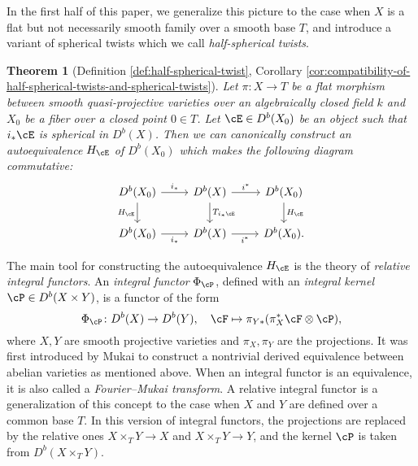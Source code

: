 \documentclass[12pt]{amsart}
\numberwithin{equation}{section}
\theoremstyle{plain}
\newtheorem{theorem}{Theorem}[section]
\theoremstyle{definition}
\begin{document}
In the first half of this paper, we generalize this picture to the case when $X$ is a flat but not necessarily smooth family over a smooth base $T$, and introduce a variant of spherical twists which we call \emph{half-spherical twists}.
\begin{theorem}[Definition \ref{def:half-spherical-twist}, Corollary \ref{cor:compatibility-of-half-spherical-twists-and-spherical-twists}]\label{thm:main-theorem-1-half-spherical-twist}
    Let $\pi \colon X \to T$ be a flat morphism between smooth quasi-projective varieties over an algebraically closed field $k$ and $X_0$ be a fiber over a closed point $0 \in T$.
    Let $\cE \in D^b(X_0)$ be an object such that $i_*{\cE}$ is spherical in $D^b(X)$.
    Then we can canonically construct an autoequivalence $H_{\cE}$ of $D^b(X_0)$ which makes the following diagram commutative:
    \begin{equation}\label{eq:half-spherical-twist-commutative-diagram}
        \begin{tikzcd}
            D^b(X_0) \ar[r, "i_*"] \ar[d, "H_{\cE}"'] & D^b(X) \ar[r, "i^*"]\ar[d, "T_{i_*{\cE}}"] & D^b(X_0) \ar[d,  "H_{\cE}"]\\
            D^b(X_0) \ar[r, "i_*"'] & D^b(X) \ar[r, "i^*"'] & D^b(X_0).
        \end{tikzcd}
    \end{equation}
\end{theorem}

The main tool for constructing the autoequivalence $H_{\cE}$ is the theory of \emph{relative integral functors}.
An \emph{integral functor} $\Phi_{\cP}$, defined with an \emph{integral kernel} $\cP \in D^b(X \times Y)$, is a functor of the form
\begin{equation}
    \Phi_{\cP} \colon D^b(X) \to D^b(Y), \quad \cF \mapsto \pi_{Y*}(\pi_X^*\cF \otimes \cP),
\end{equation}
where $X, Y$ are smooth projective varieties and $\pi_X, \pi_Y$ are the projections.
It was first introduced by Mukai \cite{MR607081} to construct a nontrivial derived equivalence between abelian varieties as mentioned above.
When an integral functor is an equivalence, it is also called a \emph{Fourier--Mukai transform}.
A relative integral functor is a generalization of this concept to the case when $X$ and $Y$ are defined over a common base $T$.
In this version of integral functors, the projections are replaced by the relative ones $X \times_T Y \to X$ and $X \times_T Y \to Y$, and the kernel $\cP$ is taken from $D^b(X \times_T Y)$.
\end{document}
